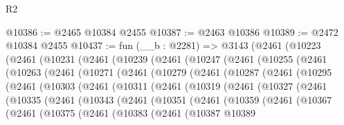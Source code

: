 \begin{lexlean}{R2}
\begin{coremodule}
@10386 := @2465 @10384 @2455
@10387 := @2463 @10386
@10389 := @2472 @10384 @2455
@10437 := fun (__b : @2281) =>
  @3143
    (@2461
      (@10223
        (@2461
          (@10231
            (@2461
              (@10239
                (@2461
                  (@10247
                    (@2461
                      (@10255
                        (@2461
                          (@10263
                            (@2461
                              (@10271
                                (@2461
                                  (@10279
                                    (@2461
                                      (@10287
                                        (@2461
                                          (@10295
                                            (@2461
                                              (@10303
                                                (@2461
                                                  (@10311
                                                    (@2461
                                                      (@10319
                                                        (@2461
                                                          (@10327
                                                            (@2461
                                                              (@10335
                                                                (@2461
                                                                  (@10343
                                                                    (@2461
                                                                      (@10351
                                                                        (@2461
                                                                          (@10359
                                                                            (@2461
                                                                              (@10367
                                                                                (@2461
                                                                                  (@10375
                                                                                    (@2461
                                                                                      (@10383
                                                                                        (@2461
                                                                                          (@10387
                                                                                            @10389

\end{coremodule}
\end{lexlean}
